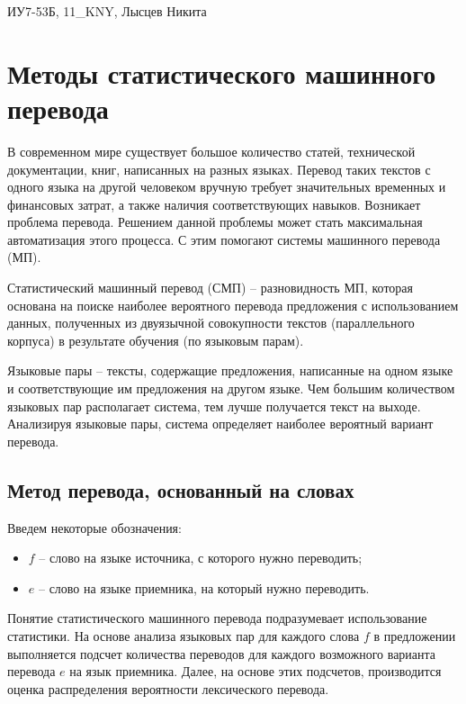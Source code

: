 ИУ7-53Б, 11\_KNY, Лысцев Никита

\section*{Методы статистического машинного перевода}


В современном мире существует большое количество статей, технической документации, книг, написанных на разных языках. Перевод таких текстов с одного языка на другой человеком вручную требует значительных временных и финансовых затрат, а также наличия соответствующих навыков. Возникает проблема перевода. Решением данной проблемы может стать максимальная автоматизация этого процесса. С этим помогают системы машинного перевода (МП).


Статистический машинный перевод (СМП) -- разновидность МП, которая основана на поиске наиболее вероятного перевода предложения с использованием данных, полученных из двуязычной совокупности текстов (параллельного корпуса) в результате  обучения (по языковым парам)\cite{smt}.

Языковые пары -- тексты, содержащие предложения, написанные на одном языке и соответствующие им предложения на другом языке. Чем большим количеством языковых пар располагает система, тем лучше получается текст на выходе. Анализируя языковые пары, система определяет наиболее вероятный вариант перевода.

\subsection*{Метод перевода, основанный на словах}

Введем некоторые обозначения:

\begin{itemize}[label*=--]
	\item $f$ -- слово на языке источника, с которого нужно переводить;
	\item $e$ -- слово на языке приемника, на который нужно переводить.
\end{itemize}

Понятие статистического машинного перевода подразумевает использование статистики. На основе анализа языковых пар для каждого слова $f$ в предложении выполняется подсчет количества переводов для каждого возможного варианта перевода $e$ на язык приемника. Далее, на основе этих подсчетов, производится оценка распределения вероятности лексического перевода. 

